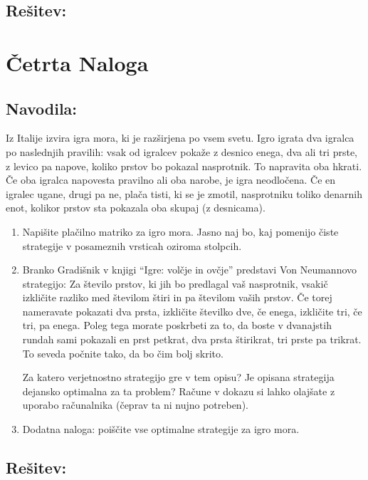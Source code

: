 \documentclass[a4paper, 10pt]{article}
\begin{document}
\subsection{Rešitev:}

\section{Četrta Naloga}
\subsection{Navodila:}
Iz Italije izvira igra mora, ki je razširjena po vsem svetu. Igro igrata dva igralca po naslednjih pravilih: vsak od igralcev pokaže z desnico enega, dva ali tri prste, z levico pa napove, koliko prstov bo pokazal nasprotnik. To napravita oba hkrati. Če oba igralca napovesta pravilno ali oba narobe, je igra neodločena. Če en igralec ugane, drugi pa ne, plača tisti, ki se je zmotil, nasprotniku toliko denarnih enot, kolikor prstov sta pokazala oba skupaj (z desnicama).
\begin{enumerate}[label=(\alph*)]
	\item Napišite plačilno matriko za igro mora. Jasno naj bo, kaj pomenijo čiste strategije v posameznih vrsticah oziroma stolpcih.
	\item Branko Gradišnik v knjigi “Igre: volčje in ovčje” predstavi Von Neumannovo strategijo: Za število prstov, ki jih bo predlagal vaš nasprotnik, vsakič izkličite razliko med številom štiri in pa številom vaših prstov. Če torej nameravate pokazati dva prsta, izkličite številko dve, če enega, izkličite tri, če tri, pa enega. Poleg tega morate poskrbeti za to, da boste v dvanajstih rundah sami pokazali en prst petkrat, dva prsta štirikrat, tri prste pa trikrat. To seveda počnite tako, da bo čim bolj skrito. 
	
	Za katero verjetnostno strategijo gre v tem opisu? Je opisana strategija dejansko optimalna za ta problem? Račune v dokazu si lahko olajšate z uporabo računalnika (čeprav ta ni nujno potreben).
	\item Dodatna naloga: poiščite vse optimalne strategije za igro mora.
\end{enumerate}
\subsection{Rešitev:}
\end{document}
